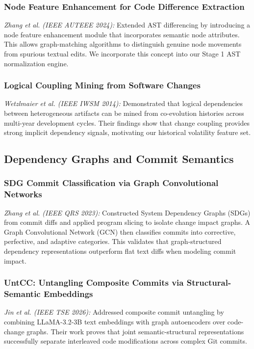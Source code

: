 \documentclass[conference]{IEEEtran}
\begin{document}
\subsubsection{Node Feature Enhancement for Code Difference Extraction}
\emph{Zhang et al. \cite{Zhang2024} (IEEE AUTEEE 2024):} Extended AST differencing by introducing a node feature enhancement module that incorporates semantic node attributes. This allows graph-matching algorithms to distinguish genuine node movements from spurious textual edits. We incorporate this concept into our Stage 1 AST normalization engine.

\subsubsection{Logical Coupling Mining from Software Changes}
\emph{Wetzlmaier et al. \cite{Wetzlmaier2014} (IEEE IWSM 2014):} Demonstrated that logical dependencies between heterogeneous artifacts can be mined from co-evolution histories across multi-year development cycles. Their findings show that change coupling provides strong implicit dependency signals, motivating our historical volatility feature set.

\subsection{Dependency Graphs and Commit Semantics}

\subsubsection{SDG Commit Classification via Graph Convolutional Networks}
\emph{Zhang et al. \cite{Zaixing2023} (IEEE QRS 2023):} Constructed System Dependency Graphs (SDGs) from commit diffs and applied program slicing to isolate change impact graphs. A Graph Convolutional Network (GCN) then classifies commits into corrective, perfective, and adaptive categories. This validates that graph-structured dependency representations outperform flat text diffs when modeling commit impact.

\subsubsection{UntCC: Untangling Composite Commits via Structural-Semantic Embeddings}
\emph{Jin et al. \cite{Jin2026} (IEEE TSE 2026):} Addressed composite commit untangling by combining LLaMA-3.2-3B text embeddings with graph autoencoders over code-change graphs. Their work proves that joint semantic-structural representations successfully separate interleaved code modifications across complex Git commits.
\end{document}
